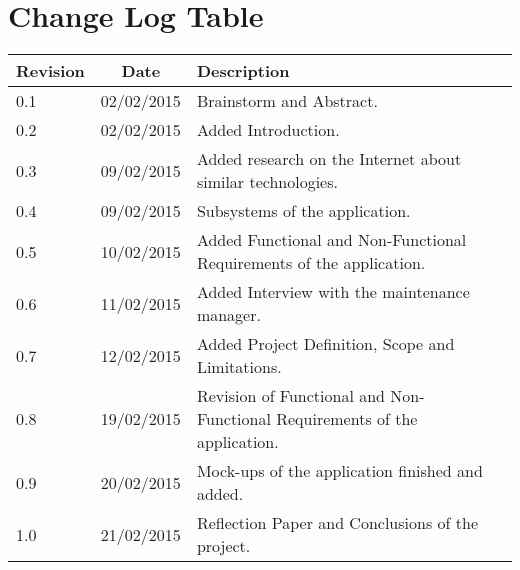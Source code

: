 \section{Change Log Table}

\begin{tabular}{|p{5cm} | c|p{5cm}| p{2cm}|}
\hline Revision & Date & Description \\\hline
0.1 & 02/02/2015 & Brainstorm and Abstract.\\\hline
0.2 & 02/02/2015 & Added Introduction.\\\hline
0.3 & 09/02/2015 & Added research on the Internet about similar technologies.\\\hline
0.4 & 09/02/2015 & Subsystems of the application.\\\hline
0.5 & 10/02/2015 & Added Functional and Non-Functional Requirements of the application.\\\hline
0.6 & 11/02/2015 & Added Interview with the maintenance manager.\\\hline
0.7 & 12/02/2015 & Added Project Definition, Scope and Limitations.\\\hline
0.8 & 19/02/2015 & Revision of Functional and Non-Functional Requirements of the application.\\\hline
0.9 & 20/02/2015 & Mock-ups of the application finished and added.\\\hline
1.0 & 21/02/2015 & Reflection Paper and Conclusions of the project.\\\hline

\end{tabular}
